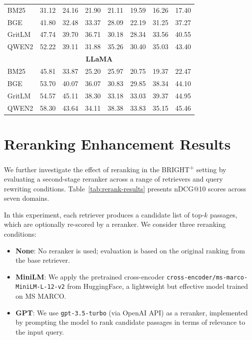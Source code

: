 \documentclass[11pt]{article}
\begin{document}
\begin{table}[h]
\begin{tabular}{l|ccccccc}
\midrule
BM25   & 31.12 & 24.16 & 21.90 & 21.11 & 19.59 & 16.26 & 17.40 \\
BGE    & 41.80 & 32.48 & 33.37 & 28.09 & 22.19 & 31.25 & 37.27 \\
GritLM & 47.74 & 39.70 & 36.71 & 30.18 & 28.34 & 33.56 & 40.55 \\
QWEN2  & 52.22 & 39.11 & 31.88 & 35.26 & 30.40 & 35.03 & 43.40 \\
\midrule
\multicolumn{8}{c}{\textbf{LLaMA}} \\
\midrule
BM25   & 45.81 & 33.87 & 25.20 & 25.97 & 20.75 & 19.37 & 22.47 \\
BGE    & 53.70 & 40.07 & 36.07 & 30.83 & 29.85 & 38.34 & 44.10 \\
GritLM & 54.57 & 45.11 & 38.30 & 33.18 & 33.03 & 39.37 & 44.95 \\
QWEN2  & 58.30 & 43.64 & 34.11 & 38.38 & 33.83 & 35.15 & 45.46 \\
\bottomrule
\end{tabular}
\label{tab:reasoning-results-percent}
\end{table}

\clearpage
\section{Reranking Enhancement Results}
\label{app:rerank}

We further investigate the effect of reranking in the BRIGHT\textsuperscript{+} setting by evaluating a second-stage reranker across a range of retrievers and query rewriting conditions. Table~\ref{tab:rerank-results} presents nDCG@10 scores across seven domains.

In this experiment, each retriever produces a candidate list of top-$k$ passages, which are optionally re-scored by a reranker. We consider three reranking conditions:

\begin{itemize}
    \item \textbf{None}: No reranker is used; evaluation is based on the original ranking from the base retriever.
    \item \textbf{MiniLM}: We apply the pretrained cross-encoder \texttt{cross-encoder/ms-marco-MiniLM-L-12-v2} from HuggingFace, a lightweight but effective model trained on MS MARCO.
    \item \textbf{GPT}: We use \texttt{gpt-3.5-turbo} (via OpenAI API) as a reranker, implemented by prompting the model to rank candidate passages in terms of relevance to the input query.
\end{itemize}
\end{document}
